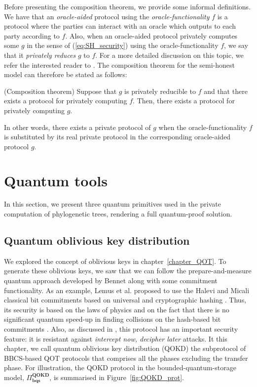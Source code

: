 Before presenting the composition theorem, we provide some informal definitions. We have that an \textit{oracle-aided} protocol using the \textit{oracle-functionality} $f$ is a protocol where the parties can interact with an oracle which outputs to each party according to $f$. Also, when an oracle-aided protocol privately computes some $g$ in the sense of (\ref{eq:SH_security}) using the oracle-functionality $f$, we say that it \textit{privately reduces} $g$ to $f$. For a more detailed discussion on this topic, we refer the interested reader to \cite{Goldreich98}. The composition theorem for the semi-honest model can therefore be stated as follows:

\begin{theorem}(Composition theorem)\label{compositionthm}
Suppose that $g$ is privately reducible to $f$ and that there exists a protocol for privately computing $f$. Then, there exists a protocol for privately computing $g$.
\end{theorem}

In other words, there exists a private protocol of $g$ when the oracle-functionality $f$ is substituted by its real private protocol in the corresponding oracle-aided protocol $g$.



\section{Quantum tools} \label{quantumTools}

In this section, we present three quantum primitives used in the private computation of phylogenetic trees, rendering a full quantum-proof solution.


\subsection{Quantum oblivious key distribution}

We explored the concept of oblivious keys in chapter~\ref{chapter_QOT}. To generate these oblivious keys, we saw that we can follow the prepare-and-measure quantum approach developed by Bennet \cite{BBCS92} along with some commitment functionality. As an example, Lemus et al. \cite{Lemus20} proposed to use the Halevi and Micali classical bit commitments based on universal and cryptographic hashing \cite{HM96}. Thus, its security is based on the laws of physics and on the fact that there is no significant quantum speed-up in finding collisions on the hash-based bit commitments \cite{Shi02, ABLST17, Lemus20}. Also, as discussed in \cite{Lemus20, SPM21}, this protocol has an important security feature: it is resistant against \textit{intercept now, decipher later} attacks. It this chapter, we call quantum oblivious key distribution (QOKD) the subprotocol of BBCS-based QOT protocols that comprises all the phases excluding the transfer phase. For illustration, the QOKD protocol in the bounded-quantum-storage model, $\Pi^{\textbf{QOKD}}_{\textbf{bqs}}$, is summarised in Figure~\ref{fig:QOKD_prot}.

